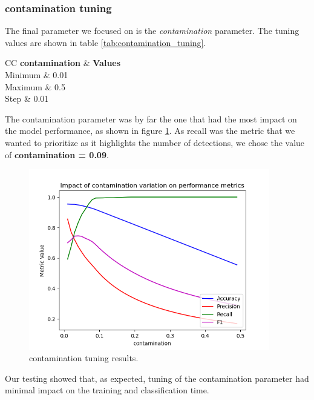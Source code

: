 \documentclass[futureinternet,article,submit,pdftex,moreauthors]{Definitions/mdpi}
\begin{document}
\subsubsection{contamination tuning}

The final parameter we focused on is the \textit{contamination} parameter. The tuning values are shown in table \ref{tab:contamination_tuning}.

\begin{table}[H]
	\caption{contamination tuning values.}\label{tab:contamination_tuning}
	\begin{tabularx}{\textwidth}{CC}
	\toprule
	\textbf{contamination} & \textbf{Values} \\
	\midrule
	Minimum & 0.01 \\
	Maximum & 0.5 \\
	Step & 0.01 \\
	\bottomrule
	\end{tabularx}
\end{table}

The contamination parameter was by far the one that had the most impact on the model performance, as shown in figure \ref{fig:contamination_tuning}.
As recall was the metric that we wanted to prioritize as it highlights the number of detections, we chose the value of \textbf{contamination = 0.09}.

\begin{figure}[H]
	\includegraphics[width=10.5cm]{img/contaminationTuning.png}
	\caption{contamination tuning results.}\label{fig:contamination_tuning}
\end{figure}
\unskip

Our testing showed that, as expected, tuning of the contamination parameter had minimal impact on the training and classification time. 
\end{document}
